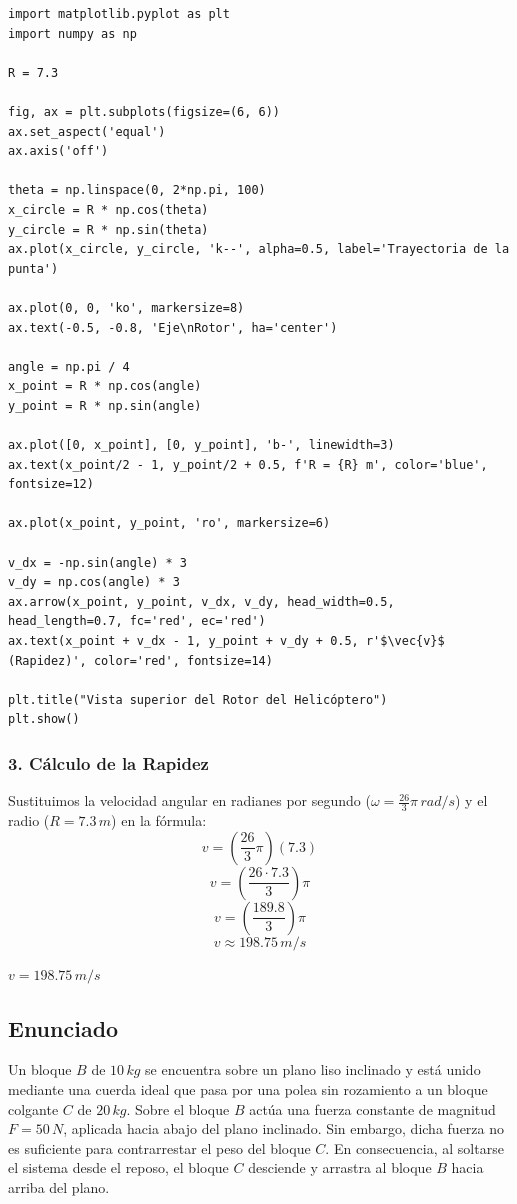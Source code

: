 \documentclass[12pt, a4paper]{article}
\begin{document}
\begin{lstlisting}
import matplotlib.pyplot as plt
import numpy as np

R = 7.3

fig, ax = plt.subplots(figsize=(6, 6))
ax.set_aspect('equal')
ax.axis('off')

theta = np.linspace(0, 2*np.pi, 100)
x_circle = R * np.cos(theta)
y_circle = R * np.sin(theta)
ax.plot(x_circle, y_circle, 'k--', alpha=0.5, label='Trayectoria de la punta')

ax.plot(0, 0, 'ko', markersize=8)
ax.text(-0.5, -0.8, 'Eje\nRotor', ha='center')

angle = np.pi / 4
x_point = R * np.cos(angle)
y_point = R * np.sin(angle)

ax.plot([0, x_point], [0, y_point], 'b-', linewidth=3)
ax.text(x_point/2 - 1, y_point/2 + 0.5, f'R = {R} m', color='blue', fontsize=12)

ax.plot(x_point, y_point, 'ro', markersize=6)

v_dx = -np.sin(angle) * 3
v_dy = np.cos(angle) * 3
ax.arrow(x_point, y_point, v_dx, v_dy, head_width=0.5, head_length=0.7, fc='red', ec='red')
ax.text(x_point + v_dx - 1, y_point + v_dy + 0.5, r'$\vec{v}$ (Rapidez)', color='red', fontsize=14)

plt.title("Vista superior del Rotor del Helicóptero")
plt.show()
\end{lstlisting}

\subsubsection*{3. Cálculo de la Rapidez}
Sustituimos la velocidad angular en radianes por segundo ($\omega = \frac{26}{3}\pi \, \si{rad/s}$) y el radio ($R = 7.3 \, \si{m}$) en la fórmula:
$$ v = \left( \frac{26}{3}\pi \right) (7.3) $$
$$ v = \left( \frac{26 \cdot 7.3}{3} \right) \pi $$
$$ v = \left( \frac{189.8}{3} \right) \pi $$
$$ v \approx 198.75 \, \si{m/s} $$

\begin{tcolorbox}[colback=green!5!white, colframe=green!50!black, title=Respuesta Final]
\centering \Large $v = 198.75 \, \si{m/s}$
\end{tcolorbox}

\newpage

\subsection*{Enunciado}
Un bloque $B$ de $10 \, \si{kg}$ se encuentra sobre un plano liso inclinado y está unido mediante una cuerda ideal que pasa por una polea sin rozamiento a un bloque colgante $C$ de $20 \, \si{kg}$. Sobre el bloque $B$ actúa una fuerza constante de magnitud $F = 50 \, \si{N}$, aplicada hacia abajo del plano inclinado. Sin embargo, dicha fuerza no es suficiente para contrarrestar el peso del bloque $C$. En consecuencia, al soltarse el sistema desde el reposo, el bloque $C$ desciende y arrastra al bloque $B$ hacia arriba del plano. 
\end{document}
